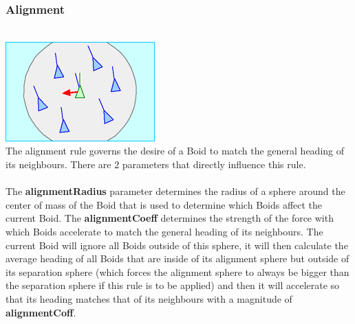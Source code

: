 \documentclass[12pt]{article}
\begin{document}
\subsubsection{Alignment}
\\ \includegraphics[width=\textwidth,height=\textheight,keepaspectratio]{Rule_alignment.gif} \\
The alignment rule governs the desire of a Boid to match the general heading of its neighbours. There are 2 parameters that directly influence this rule.
\\ \\
The \textbf{alignmentRadius} parameter determines the radius of a sphere around the center of mass of the Boid that is used to determine which Boids affect the current Boid. The \textbf{alignmentCoeff} determines the strength of the force with which Boids accelerate to match the general heading of its neighbours. The current Boid will ignore all Boids outside of this sphere, it will then calculate the average heading of all Boids that are inside of its alignment sphere but outside of its separation sphere (which forces the alignment sphere to always be bigger than the separation sphere if this rule is to be applied) and then it will accelerate so that its heading matches that of its neighbours with a magnitude of \textbf{alignmentCoff}.
\end{document}
